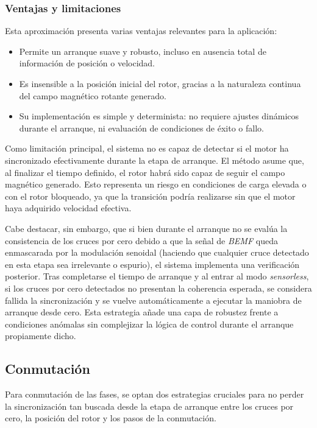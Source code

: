 \subsubsection{Ventajas y limitaciones}

Esta aproximación presenta varias ventajas relevantes para la aplicación:

\begin{itemize}
    \item Permite un arranque suave y robusto, incluso en ausencia total de información de posición o velocidad.
    \item Es insensible a la posición inicial del rotor, gracias a la naturaleza continua del campo magnético rotante generado.
    \item Su implementación es simple y determinista: no requiere ajustes dinámicos durante el arranque, ni evaluación de condiciones de éxito o fallo.
\end{itemize}

Como limitación principal, el sistema no es capaz de detectar si el motor ha sincronizado efectivamente durante la etapa de arranque. El método asume que, al finalizar el tiempo definido, el rotor habrá sido capaz de seguir el campo magnético generado. Esto representa un riesgo en condiciones de carga elevada o con el rotor bloqueado, ya que la transición podría realizarse sin que el motor haya adquirido velocidad efectiva.

Cabe destacar, sin embargo, que si bien durante el arranque no se evalúa la consistencia de los cruces por cero debido a que la señal de \textit{BEMF} queda enmascarada por la modulación senoidal (haciendo que cualquier cruce detectado en esta etapa sea irrelevante o espurio), el sistema implementa una verificación posterior. Tras completarse el tiempo de arranque y al entrar al modo \textit{sensorless}, si los cruces por cero detectados no presentan la coherencia esperada, se considera fallida la sincronización y se vuelve automáticamente a ejecutar la maniobra de arranque desde cero. Esta estrategia añade una capa de robustez frente a condiciones anómalas sin complejizar la lógica de control durante el arranque propiamente dicho.

\subsection{Conmutación}
Para conmutación de las fases, se optan dos estrategias cruciales para no perder la sincronización tan buscada desde la etapa de arranque entre los cruces por cero, la posición del rotor y los pasos de la conmutación.

